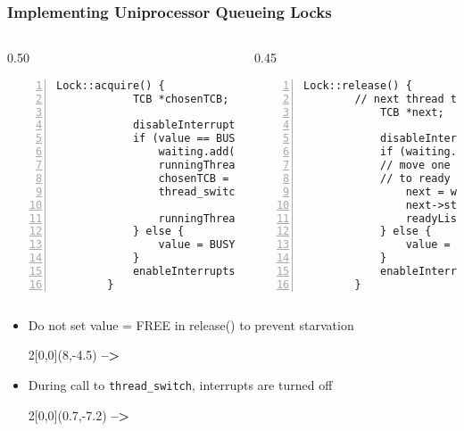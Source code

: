 \documentclass[mathserif,serif,14pt,aspectratio=169]{beamer}
\begin{document}
\begin{frame} [fragile]
	\frametitle{Implementing Uniprocessor Queueing Locks}
	{
	\fontsize{8}{8}\selectfont
	\begin{columns}
		\begin{column}{0.50\textwidth}
		\begin{lstlisting}[style=cstyle, gobble=8, frame=single, 
							numbers=left, numberstyle=\ttfamily]
		Lock::acquire() {
			TCB *chosenTCB;

			disableInterrupts();
			if (value == BUSY) {
				waiting.add(runningThread);
				runningThread->state = WAITING;
				chosenTCB = readyList.remove();
				thread_switch(runningThread,
				              chosenTCB);
				runningThread->state = RUNNING;
			} else {
				value = BUSY;
			}
			enableInterrupts();
		}
		\end{lstlisting}
		\end{column}
		\begin{column}{0.45\textwidth}
		\begin{lstlisting}[style=cstyle, gobble=8, frame=single, 
							numbers=left, numberstyle=\ttfamily]
		Lock::release() {
		// next thread to hold lock
			TCB *next;

			disableInterrupts();
			if (waiting.notEmpty()) {
			// move one TCB from waiting
			// to ready
				next = waiting.remove();
				next->state = READY;
				readyList.add(next);
			} else {
				value = FREE;
			}
			enableInterrupts();
		}
		\end{lstlisting}
		\end{column}
	\end{columns}
	}
	\begin{itemize}\setlength\itemsep{0.5em}
	\item<2-> Do not set value = FREE in release() to prevent starvation
		\begin{textblock}{2}[0,0](8,-4.5)
			{\color{red} \textbf{-->}}	%
		\end{textblock}
	\item<3-> During call to \lstinline{thread_switch}, interrupts are turned off
		\begin{textblock}{2}[0,0](0.7,-7.2)
			{\color{red} \textbf{-->}}	%
		\end{textblock}
	\end{itemize}
\end{frame}
\end{document}
